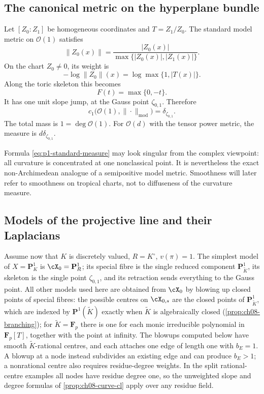 \subsection{The canonical metric on the hyperplane bundle}

Let $[Z_0:Z_1]$ be homogeneous coordinates and $T=Z_1/Z_0$.  The standard
model metric on $\mathcal O(1)$ satisfies
\[
 \|Z_0(x)\|=\frac{|Z_0(x)|}{\max\{|Z_0(x)|,|Z_1(x)|\}}.
\]
On the chart $Z_0\neq0$, its weight is
\begin{equation}
\label{eq:p1-standard-weight}
      -\log\|Z_0\|(x)=\log\max\{1,|T(x)|\}.
\end{equation}
Along the toric skeleton this becomes
\[
                         F(t)=\max\{0,-t\}.
\]
It has one unit slope jump, at the Gauss point $\zeta_{0,1}$.  Therefore
\begin{equation}
\label{eq:p1-standard-measure}
 c_1\bigl(\mathcal O(1),\|\cdot\|_{\mathrm{mod}}\bigr)
 =\delta_{\zeta_{0,1}}.
\end{equation}
The total mass is $1=\deg\mathcal O(1)$.  For $\mathcal O(d)$ with the tensor
power metric, the measure is $d\delta_{\zeta_{0,1}}$.

\begin{remark}
\label{rem:ch08-standard-metric-atomic}
Formula \eqref{eq:p1-standard-measure} may look singular from the complex
viewpoint: all curvature is concentrated at one nonclassical point.  It is
nevertheless the exact non-Archimedean analogue of a semipositive model
metric.  Smoothness will later refer to smoothness on tropical charts, not
to diffuseness of the curvature measure.
\end{remark}

\subsection{Models of the projective line and their Laplacians}
\label{sec:ch08-p1-models}

Assume now that $K$ is discretely valued, $R=K^\circ$, $v(\pi)=1$.  The
simplest model of $X=\mathbf P^1_K$ is $\cX_0=\mathbf P^1_R$; its special
fibre is the single reduced component $\mathbf P^1_{\widetilde K}$, its
skeleton is the single point $\zeta_{0,1}$, and its retraction sends
everything to the Gauss point.  All other models used here are obtained from
$\cX_0$ by blowing up closed points of special fibres: the possible centres
on $\cX_{0,s}$ are the closed points of $\mathbf P^1_{\widetilde K}$, which
are indexed by $\mathbf P^1(\widetilde K)$ exactly when $\widetilde K$ is
algebraically closed (\cref{prop:ch08-branching}); for
$\widetilde K=\mathbf F_p$ there is one for each monic irreducible polynomial
in $\mathbf F_p[T]$, together with the point at infinity.  The blowups computed below have smooth $\widetilde K$-rational centres,
and each attaches one edge of length one with $b_E=1$.  A blowup at a node
instead subdivides an existing edge and can produce $b_E>1$; a nonrational
centre also requires residue-degree weights.  In the split rational-centre
examples all nodes have residue degree one, so the unweighted slope and
degree formulas of \cref{prop:ch08-curve-cl} apply over any residue field.

